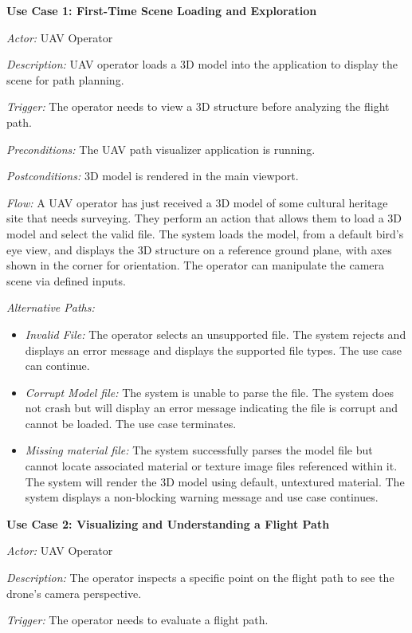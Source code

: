 \documentclass[11pt,a4paper]{article}
\begin{document}
\textbf{Use Case 1: First-Time Scene Loading and Exploration}

\textit{Actor:} UAV Operator

\textit{Description:} UAV operator loads a 3D model into the application to display the scene for path planning.

\textit{Trigger:} The operator needs to view a 3D structure before analyzing the flight path.

\textit{Preconditions:} The UAV path visualizer application is running.

\textit{Postconditions:} 3D model is rendered in the main viewport.

\textit{Flow:} A UAV operator has just received a 3D model of some cultural heritage site that needs surveying. They perform an action that allows them to load a 3D model and select the valid file. The system loads the model, from a default bird's eye view, and displays the 3D structure on a reference ground plane, with axes shown in the corner for orientation. The operator can manipulate the camera scene via defined inputs.

\textit{Alternative Paths:}
\begin{itemize}
\item \textit{Invalid File:} The operator selects an unsupported file. The system rejects and displays an error message and displays the supported file types. The use case can continue.
\item \textit{Corrupt Model file:} The system is unable to parse the file. The system does not crash but will display an error message indicating the file is corrupt and cannot be loaded. The use case terminates.
\item \textit{Missing material file:} The system successfully parses the model file but cannot locate associated material or texture image files referenced within it. The system will render the 3D model using default, untextured material. The system displays a non-blocking warning message and use case continues.
\end{itemize}

\textbf{Use Case 2: Visualizing and Understanding a Flight Path}

\textit{Actor:} UAV Operator

\textit{Description:} The operator inspects a specific point on the flight path to see the drone's camera perspective.

\textit{Trigger:} The operator needs to evaluate a flight path.
\end{document}
